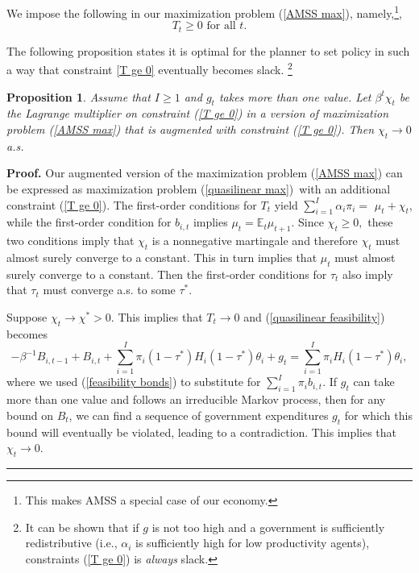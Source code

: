 \documentclass[thmsb,11pt]{article}
\newtheorem{proposition}{Proposition}
\newenvironment{proof}[1][Proof]{\noindent \textbf{#1.} }{\  \rule{0.5em}{0.5em}}
\begin{document}
We impose  the following in our maximization problem (\ref{AMSS max}), namely,\footnote{This makes AMSS a special case of our economy.},
\begin{equation}
T_{t}\geq 0\text{ for all }t.  \label{T ge 0}
\end{equation}%


The following proposition states it is optimal for the planner to set policy in such a way that constraint \eqref{T ge 0} eventually becomes slack. \footnote{It can be shown that if $g$ is not too high and a government is sufficiently redistributive (i.e.,  $\alpha_i$ is sufficiently high for low productivity agents), constraints (\ref{T ge 0}) is \emph{always} slack.}
\smallskip
\begin{proposition}\label{prop:AMSS_killer1}
Assume that $I \geq 1$ and $g_t$ takes more than one value. Let $\beta ^{t}\chi _{t}$ be the Lagrange multiplier on constraint (\ref{T
ge 0}) in a version of  maximization problem (\ref{AMSS max}) that is augmented with constraint (\ref{T
ge 0}). Then $\chi _{t}\rightarrow
0 $ a.s.
\end{proposition}

\begin{proof}
\smallskip Our augmented version of the maximization problem (\ref{AMSS max}) can be expressed
as maximization problem (\ref{quasilinear max})\ with an additional
constraint (\ref{T ge 0}). The first-order conditions for $T_{t}$ yield $%
\sum_{i=1}^{I}\alpha _{i}\pi _{i}=$ $\mu _{t}+\chi _{t}$, while the
first-order condition for $b_{i,t}$ implies $\mu _{t}=\mathbb{E}%
_{t}\mu _{t+1}.$ Since $\chi _{t}\geq 0,$ these two conditions imply
that $\chi _{t}$ is a nonnegative martingale and therefore $\chi _{t}$ must
almost surely converge to a constant. This in turn implies that $\mu _{t}$ must
almost surely converge to a constant. Then the first-order conditions for $\tau _{t}$
also imply that $\tau _{t}$ must converge a.s. to some $\tau ^{\ast }.$

Suppose $\chi _{t}\rightarrow \chi ^{\ast }>0.$ This implies that $%
T_{t}\rightarrow 0$ and (\ref{quasilinear feasibility}) becomes
\begin{equation*}
-\beta ^{-1}B_{i,t-1}+B_{i,t}+\sum_{i=1}^{I}\pi _{i}\left( 1-\tau ^{\ast
}\right) H_{i}\left( 1-\tau ^{\ast }\right)\theta_i +g_{t}=\sum_{i=1}^{I}\pi
_{i}H_{i}\left( 1-\tau ^{\ast }\right)\theta_i,
\end{equation*}%
where we used (\ref{feasibility bonds}) to substitute for $\sum_{i=1}^{I}\pi
_{i}b_{i,t}.$ If $g_{t}$ can take more than one value and follows an irreducible
Markov process, then for any bound on $B_{t}$, we can find a sequence of
government expenditures $g_{t}$ for which this bound will eventually be
violated, leading to a contradiction. This implies that $\chi
_{t}\rightarrow 0.$
\end{proof}
\end{document}
